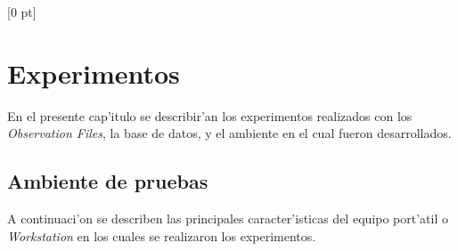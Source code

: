 \titlespacing{\chapter}{0 pt}{30 pt}{50 pt}[0 pt]
\titleformat{\section}{\Large\bfseries}{\thesection}{0 pt}{\hspace{30 pt}}
\titleformat{\subsection}{\large\bfseries}{\thesubsection}{0 pt}{\hspace{30 pt}}
\pagestyle{fancy}
\fancyhead[LO,LE]{\footnotesize\emph{\leftmark}}
\fancyhead[RO,RE]{\thepage}
\fancyfoot[CO,CE]{}

\chapter{Experimentos} %
\normalsize
\noindent
En el presente cap'itulo se describir'an los experimentos realizados con los \emph{Observation Files}, la base de datos, y el ambiente en el cual fueron desarrollados.\\

\section{Ambiente de pruebas}
\noindent
A continuaci'on se describen las principales caracter'isticas del equipo port'atil o \emph{Workstation} en los cuales se realizaron los experimentos.\\

